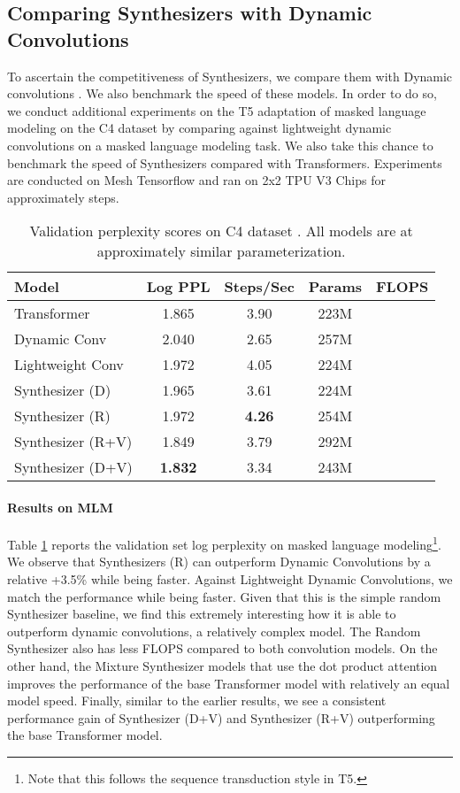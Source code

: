 \documentclass{article} \usepackage{iclr2021_conference,times}
\begin{document}
\subsection{Comparing Synthesizers with Dynamic Convolutions}
To ascertain the competitiveness of Synthesizers, we compare them with Dynamic convolutions \citep{wu2019pay}. We also benchmark the speed of these models. In order to do so, we conduct additional experiments on the T5 adaptation of masked language modeling on the C4 dataset \citep{raffel2019exploring} by comparing against lightweight dynamic convolutions \citep{wu2019pay} on a masked language modeling task. We also take this chance to benchmark the speed of Synthesizers compared with Transformers. Experiments are conducted on Mesh Tensorflow \citep{shazeer2018mesh} and ran on 2x2 TPU V3 Chips for approximately  steps.
\begin{table}[H]
    \centering
    \small
    \begin{tabular}{l|cccc}
    \hline
       Model  &  Log PPL & Steps/Sec & Params & FLOPS\\
       \hline
        Transformer \citep{vaswani2017attention} & 1.865 & 3.90 & 223M & \\ 
Dynamic Conv \citep{wu2019pay} & 2.040 & 2.65 & 257M & \\ 
        Lightweight Conv \citep{wu2019pay} & 1.972 & 4.05 & 224M &  \\ \hline
        Synthesizer (D) & 1.965 & 3.61 & 224M  & \\ 
        Synthesizer (R) & 1.972 & \textbf{4.26} & 254M &  \\ 
        Synthesizer (R+V) & 1.849 & 3.79 & 292M & \\
        Synthesizer (D+V) & \textbf{1.832} & 3.34 & 243M & \\ 
        \hline
    \end{tabular}
    \caption{Validation perplexity scores on C4 dataset \citep{raffel2019exploring}. All models are at approximately similar parameterization.}
    \label{tab:ppl}
\end{table}

\paragraph{Results on MLM} Table \ref{tab:ppl} reports the validation set log perplexity on masked language modeling\footnote{Note that this follows the sequence transduction style in T5.}. We observe that Synthesizers (R) can outperform Dynamic Convolutions by a relative +3.5\% while being  faster. Against Lightweight Dynamic Convolutions, we match the performance while being  faster. Given that this is the simple random Synthesizer baseline, we find this extremely interesting how it is able to outperform dynamic convolutions, a relatively complex model. The Random Synthesizer also has less FLOPS compared to both convolution models. On the other hand, the Mixture Synthesizer models that use the dot product attention improves the performance of the base Transformer model with relatively an equal model speed. Finally, similar to the earlier results, we see a consistent performance gain of Synthesizer (D+V) and Synthesizer (R+V) outperforming the base Transformer model.
\end{document}
